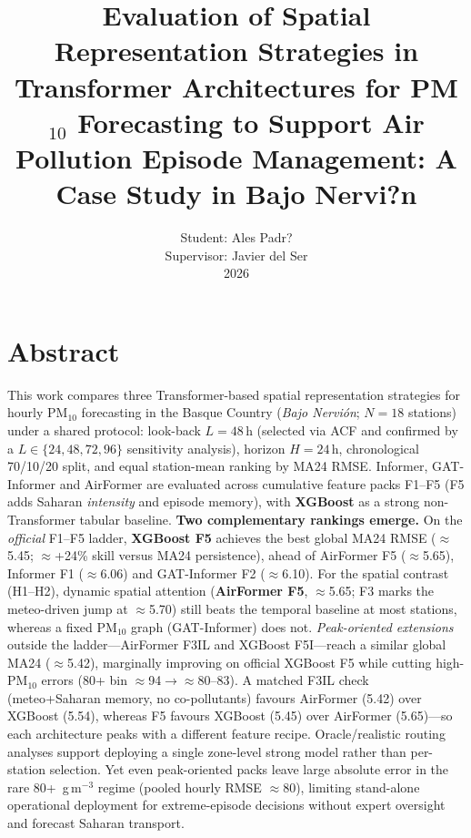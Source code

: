 \documentclass[11pt]{article}
\title{\textbf{Evaluation of Spatial Representation Strategies in Transformer Architectures for PM$_{10}$ Forecasting to Support Air Pollution Episode Management: A Case Study in Bajo Nervi?n}\\[0.4em]}
\author{
\normalsize
Student: Ales Padr?\\
Supervisor: Javier del Ser\\
2026
}
\date{}
\newcommand{\rev}[1]{#1}
\newcommand{\revnew}[1]{\textcolor{orange!75!black}{#1}}
\begin{document}
\maketitle
\vspace{-0.5em}

\section{Abstract}
\label{sec:abstract}

\rev{This work compares three Transformer-based spatial representation strategies for hourly PM$_{10}$ forecasting in the Basque Country (\textit{Bajo Nervi\'on}; $N{=}18$ stations) under a shared protocol: look-back $L{=}48$\,h (selected via ACF and confirmed by a $L\in\{24,48,72,96\}$ sensitivity analysis), horizon $H{=}24$\,h, chronological 70/10/20 split, and equal station-mean ranking by MA24 RMSE. Informer, GAT-Informer and AirFormer are evaluated across cumulative feature packs F1--F5 (F5 adds Saharan \emph{intensity} and episode memory), with \textbf{XGBoost} as a strong non-Transformer tabular baseline. \textbf{Two complementary rankings emerge.} On the \emph{official} F1--F5 ladder, \textbf{XGBoost F5} achieves the best global MA24 RMSE ($\approx$5.45; $\approx$+24\% skill versus MA24 persistence), ahead of AirFormer F5 ($\approx$5.65), Informer F1 ($\approx$6.06) and GAT-Informer F2 ($\approx$6.10). For the spatial contrast (H1--H2), dynamic spatial attention (\textbf{AirFormer F5}, $\approx$5.65; F3 marks the meteo-driven jump at $\approx$5.70) still beats the temporal baseline at most stations, whereas a fixed PM$_{10}$ graph (GAT-Informer) does not. \emph{Peak-oriented extensions} outside the ladder---AirFormer F3IL and XGBoost F5I---reach a similar global MA24 ($\approx$5.42), marginally improving on official XGBoost F5 while cutting high-PM$_{10}$ errors (80+ bin $\approx$94$\to$$\approx$80--83). A matched F3IL check (meteo+Saharan memory, no co-pollutants) favours AirFormer (5.42) over XGBoost (5.54), whereas F5 favours XGBoost (5.45) over AirFormer (5.65)---so each architecture peaks with a different feature recipe. Oracle/realistic routing analyses support deploying a single zone-level strong model rather than per-station selection.}
\revnew{Yet even peak-oriented packs leave large absolute error in the rare 80+~\textmu g\,m$^{-3}$ regime (pooled hourly RMSE $\approx$80), limiting stand-alone operational deployment for extreme-episode decisions without expert oversight and forecast Saharan transport.}
\end{document}

